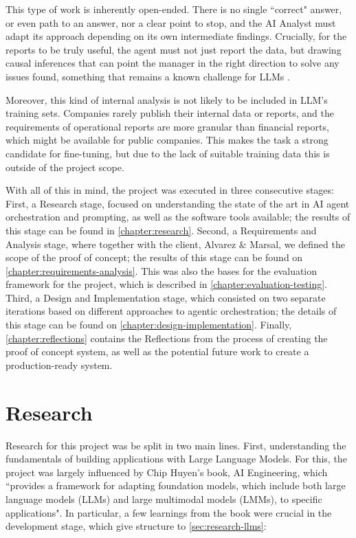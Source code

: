 \documentclass[a4paper]{report}
\begin{document}
This type of work is inherently open-ended. There is no single ``correct" answer, or even path to an answer, nor a clear point to stop, and the AI Analyst must adapt its approach depending on its own intermediate findings. Crucially, for the reports to be truly useful, the agent must not just report the data, but drawing causal inferences that can point the manager in the right direction to solve any issues found, something that remains a known challenge for LLMs \cite{llmcausalreasoning2024}.

Moreover, this kind of internal analysis is not likely to be included in LLM's training sets. Companies rarely publish their internal data or reports, and the requirements of operational reports are more granular than financial reports, which might be available for public companies. This makes the task a strong candidate for fine-tuning, but due to the lack of suitable training data this is outside of the project scope.

With all of this in mind, the project was executed in three consecutive stages: First, a Research stage, focused on understanding the state of the art in AI agent orchestration and prompting, as well as the software tools available; the results of this stage can be found in \autoref{chapter:research}. Second, a Requirements and Analysis stage, where together with the client, Alvarez \& Marsal, we defined the scope of the proof of concept; the results of this stage can be found on \autoref{chapter:requirements-analysis}. This was also the bases for the evaluation framework for the project, which is described in \autoref{chapter:evaluation-testing}. Third, a Design and Implementation stage, which consisted on two separate iterations based on different approaches to agentic orchestration; the details of this stage can be found on \autoref{chapter:design-implementation}. Finally, \autoref{chapter:reflections} contains the Reflections from the process of creating the proof of concept system, as well as the potential future work to create a production-ready system.

\chapter{Research}
\label{chapter:research}

Research for this project was be split in two main lines. First, understanding the fundamentals of building applications with Large Language Models. For this, the project was largely influenced by Chip Huyen's book, AI Engineering, which ``provides a framework for adapting foundation models, which include both large language models (LLMs) and large multimodal models (LMMs), to specific applications"\cite{aiebook2025}. In particular, a few learnings from the book were crucial in the development stage, which give structure to \autoref{sec:research-llms}:
\end{document}
